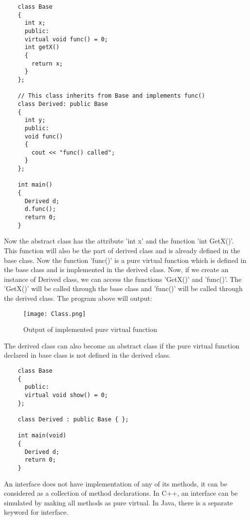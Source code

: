 \documentclass[11pt,fleqn]{book} %
\begin{document}
\begin{example}
  \begin{lstlisting}
    class Base
    {
      int x;
      public:
      virtual void func() = 0;
      int getX() 
      {
        return x; 
      }
    };

    // This class inherits from Base and implements func()
    class Derived: public Base
    {
      int y;
      public:
      void func()
      {
        cout << "func() called";
      }
    };

    int main()
    {
      Derived d;
      d.func();
      return 0;
    }
  \end{lstlisting}
  Now the abstract class has the attribute 'int x' and the function 'int GetX()'. This function will also be the part of derived class and is already defined in the base class. Now the function 'func()' is a pure virtual function which is defined in the base class and is implemented in the derived class. Now, if we create an instance of Derived class, we can access the functions 'GetX()' and 'func()'. The 'GetX()' will be called through the base class and 'func()' will be called through the derived class.
  The program above will output:
  \begin{figure}[h]
    \centering
    \texttt{[image: Class.png]}
    \caption{Output of implemented pure virtual function}
  \end{figure}
\end{example}
The derived class can also become an abstract class if the pure virtual function declared in base class is not defined in the derived class.
\begin{example}
  \begin{lstlisting}
    class Base
    {
      public:
      virtual void show() = 0;
    };

    class Derived : public Base { };

    int main(void)
    {
      Derived d;
      return 0;
    }
  \end{lstlisting}
\end{example}
\begin{corollary}
  An interface does not have implementation of any of its methods, it can be considered as a collection of method declarations. In C++, an interface can be simulated by making all methods as pure virtual. In Java, there is a separate keyword for interface.
\end{corollary}
\newpage
\end{document}
